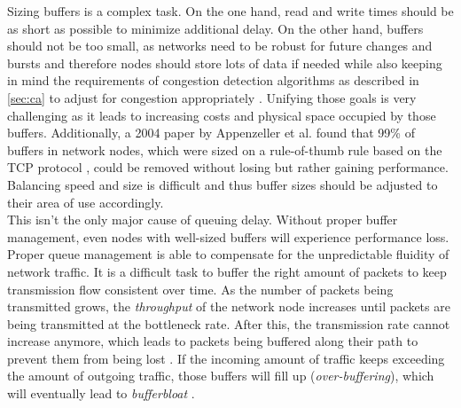 \documentclass[a4paper,conference]{IEEEtran}
\begin{document}
Sizing buffers is a complex task. On the one hand, read and write times should be as short as possible to minimize additional delay. On the other hand, buffers should not be too small, as networks need to be robust for future changes and bursts and therefore nodes should store lots of data if needed while also keeping in mind the requirements of congestion detection algorithms as described in \autoref{sec:ca} to adjust for congestion appropriately \cite{staff2012bufferbloat}. Unifying those goals is very challenging as it leads to increasing costs and physical space occupied by those buffers. Additionally, a 2004 paper by Appenzeller et al. \cite{appenzeller2004sizing} found that 99\% of buffers in network nodes, which were sized on a rule-of-thumb rule based on the TCP protocol \cite{villamizar1994high}, could be removed without losing but rather gaining performance. Balancing speed and size is difficult and thus buffer sizes should be adjusted to their area of use accordingly.
\\This isn't the only major cause of queuing delay. Without proper buffer management, even nodes with well-sized buffers will experience performance loss. Proper queue management is able to compensate for the unpredictable fluidity of network traffic. It is a difficult task to buffer the right amount of packets to keep transmission flow consistent over time.
As the number of packets being transmitted grows, the \textit{throughput} of the network node increases until packets are being transmitted at the bottleneck rate. After this, the transmission rate cannot increase anymore, which leads to packets being buffered along their path to prevent them from being lost \cite{gettys2012bufferbloat}. If the incoming amount of traffic keeps exceeding the amount of outgoing traffic, those buffers will fill up (\textit{over-buffering}), which will eventually lead to \textit{bufferbloat} \cite{Allman13commentson,6886125}.
\end{document}
